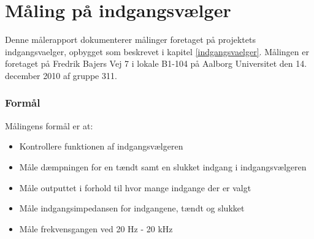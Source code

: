 \chapter{Måling på indgangsvælger}
\label{maalejournal_indgangsvaelger}

Denne målerapport dokumenterer målinger foretaget på projektets indgangsvaelger, opbygget som beskrevet i kapitel \ref{indgangsvaelger}. Målingen er foretaget på Fredrik Bajers Vej 7 i lokale B1-104 på Aalborg Universitet den 14. december 2010 af gruppe 311.

\subsection*{Formål}
\label{maalejournal_formaal}
Målingens formål er at:
\begin{itemize}
\item Kontrollere funktionen af indgangsvælgeren
\item Måle dæmpningen for en tændt samt en slukket indgang i indgangsvælgeren
\item Måle outputtet i forhold til hvor mange indgange der er valgt
\item Måle indgangsimpedansen for indgangene, tændt og slukket
\item Måle frekvensgangen ved 20 Hz - 20 kHz 
\end{itemize}

